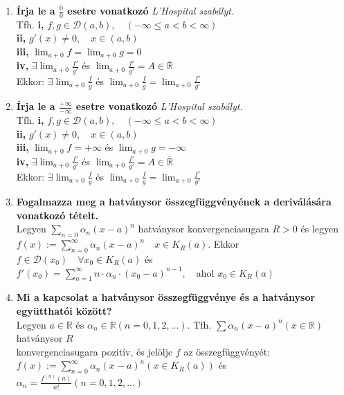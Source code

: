 \documentclass[a4paper,11pt]{article}
\begin{document}
\def\dab{\in\D(a,b)}
\def\D{\mathcal{D}}
\def\R{\mathbb{R}}
\def\sumun{\displaystyle\sum_{n=0}}
\def\sumn{\displaystyle\sum_{n=0}^{\infty}}
\def\sume{\displaystyle\sum_{n=1}^{\infty}}
\def\limaj{\displaystyle\lim_{a+0}}
\def\Rv{\overline{\mathbb{R}}}
	\begin{enumerate}
		\item \textbf{Írja le a $\frac{0}{0}$ esetre vonatkozó}
		\textit{L'Hospital szabályt.}\\[0.1cm]
		Tfh. \textbf{i,} $f,g\dab,\quad(-\infty\leq a<b<\infty)$
		\\[0.2cm]\hspace*{0.7cm} \textbf{ii,} $g'(x)\neq0,\quad x\in(a,b)$
		\\[0.2cm]\hspace*{0.8cm}\textbf{iii,} $\limaj f=\limaj g=0$
		\\[0.2cm]\hspace*{0.8cm}\textbf{iv,} $\exists\limaj \frac{f'}{g'}$ és $\limaj\frac{f'}{g'}=A\in\Rv$\\[0.2cm] Ekkor: $\exists\limaj
		\frac{f}{g}$ és $\limaj\frac{f}{g}=\limaj\frac{f'}{g'}$
		\item \textbf{Írja le a $\frac{+\infty}{-\infty}$ esetre vonatkozó}
		\textit{L'Hospital szabályt.}\\[0.1cm]
		Tfh. \textbf{i,} $f,g\dab,\quad(-\infty\leq a<b<\infty)$\\[0.2cm] 
		\hspace*{0.8cm}\textbf{ii,} $g'(x)\neq0,\quad x\in(a,b)$\\[0.2cm] 
		\hspace*{0.8cm}\textbf{iii,} $\limaj f=+\infty$ és $\limaj g=-\infty$\\[0.2cm]
		\hspace*{0.8cm}\textbf{iv,} $\exists\limaj\frac{f'}{g'}$ és $\limaj
		\frac{f'}{g'}=A\in\Rv$\\[0.2cm] Ekkor: $\exists\limaj\frac{f}{g}$ és $\limaj\frac{f}{g}=\limaj\frac{f'}{g'}$
		\item \textbf{Fogalmazza meg a hatványsor összegfüggvényének a deriválására vonatkozó tételt.}\\[0.1cm]
		Legyen $\sumun\alpha_n(x-a)^n$ hatványsor konvergenciasugara $R>0$ és 
		legyen \\$f(x):=\sumn\alpha_n(x-a)^n\quad x\in K_R(a)$. Ekkor $f\in\D(x_0)\quad\forall x_0\in K_R(a)$ és\\$f'(x_0)=\sume n\cdot
		\alpha_n\cdot(x_0-a)^{n-1},\quad$ahol $x_0\in K_R(a)$
		\item \textbf{Mi a kapcsolat a hatványsor összegfüggvénye és a hatványsor együtthatói között?}\\[0.1cm]
		Legyen $a\in\R\text{ és }\alpha_n\in\R(n=0,1,2,...).$ Tfh. $\sum\alpha_n
		(x-a)^n(x\in\R)$ hatványsor $R$\\konvergenciasugara pozitív, és jelölje
		$f$ az összegfüggvényét:\\$f(x):=\sumn\alpha_n(x-a)^n(x\in K_R(a))$ és
		$\alpha_n=\frac{f^{(n)}(a)}{n!}(n=0,1,2,...)$
	\end{enumerate}
\end{document}
